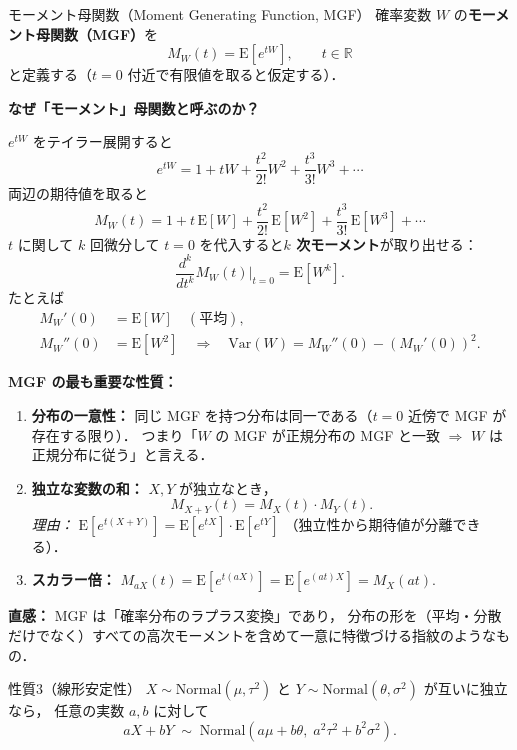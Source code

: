 \documentclass[lualatex,ja=standard,a4paper,12pt]{bxjsarticle}
\begin{document}
\begin{defbox}{モーメント母関数（Moment Generating Function, MGF）}
確率変数 $W$ の\textbf{モーメント母関数（MGF）}を
\[
  M_W(t) = \mathrm{E}[e^{tW}], \qquad t \in \mathbb{R}
\]
と定義する（$t=0$ 付近で有限値を取ると仮定する）．

\medskip
\noindent\textbf{なぜ「モーメント」母関数と呼ぶのか？}

$e^{tW}$ をテイラー展開すると
\[
  e^{tW} = 1 + tW + \frac{t^2}{2!}W^2 + \frac{t^3}{3!}W^3 + \cdots
\]
両辺の期待値を取ると
\[
  M_W(t) = 1 + t\,\mathrm{E}[W] + \frac{t^2}{2!}\,\mathrm{E}[W^2] + \frac{t^3}{3!}\,\mathrm{E}[W^3] + \cdots
\]
$t$ に関して $k$ 回微分して $t=0$ を代入すると\textbf{$k$ 次モーメント}が取り出せる：
\[
  \frac{d^k}{dt^k} M_W(t)\bigg|_{t=0} = \mathrm{E}[W^k].
\]
たとえば
\begin{align*}
  M_W'(0) &= \mathrm{E}[W] \quad (\text{平均}), \\
  M_W''(0) &= \mathrm{E}[W^2] \quad \Rightarrow\quad \mathrm{Var}(W) = M_W''(0) - (M_W'(0))^2.
\end{align*}

\medskip
\noindent\textbf{MGF の最も重要な性質：}
\begin{enumerate}
  \item \textbf{分布の一意性：} 同じ MGF を持つ分布は同一である（$t=0$ 近傍で MGF が存在する限り）．
        つまり「$W$ の MGF が正規分布の MGF と一致 $\Rightarrow$ $W$ は正規分布に従う」と言える．

  \item \textbf{独立な変数の和：} $X, Y$ が独立なとき，
        \[
          M_{X+Y}(t) = M_X(t) \cdot M_Y(t).
        \]
        \textit{理由：} $\mathrm{E}[e^{t(X+Y)}] = \mathrm{E}[e^{tX}]\cdot\mathrm{E}[e^{tY}]$
        （独立性から期待値が分離できる）．

  \item \textbf{スカラー倍：} $M_{aX}(t) = \mathrm{E}[e^{t(aX)}] = \mathrm{E}[e^{(at)X}] = M_X(at)$.
\end{enumerate}

\medskip
\noindent\textbf{直感：} MGF は「確率分布のラプラス変換」であり，
分布の形を（平均・分散だけでなく）すべての高次モーメントを含めて一意に特徴づける指紋のようなもの．
\end{defbox}

\begin{thmbox}{性質3（線形安定性）}
$X \sim \mathrm{Normal}(\mu, \tau^2)$ と $Y \sim \mathrm{Normal}(\theta, \sigma^2)$ が互いに独立なら，
任意の実数 $a, b$ に対して
\[
  aX + bY \;\sim\; \mathrm{Normal}(a\mu + b\theta,\; a^2\tau^2 + b^2\sigma^2).
\]
\end{thmbox}
\end{document}
